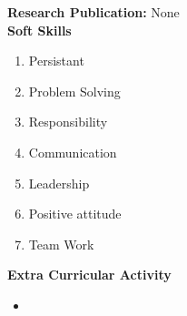\documentclass[10pt,twoside,a4paper]{article}
\begin{document}
\noindent
\textbf{Research Publication:}
None\\

\noindent
\textbf{Soft Skills}
\begin{enumerate}
\item Persistant
\item Problem Solving
\item Responsibility
\item Communication
\item Leadership
\item Positive attitude
\item Team Work 
\\
\end{enumerate}

\noindent
\textbf{Extra Curricular Activity}
\begin{itemize}
\item 
\end{itemize}
\end{document}
